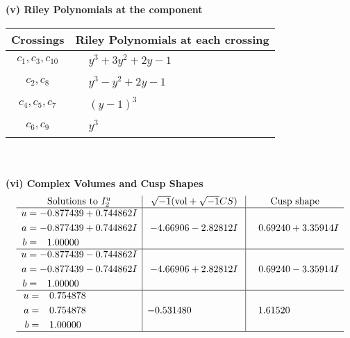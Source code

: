 \documentclass[1p]{elsarticle_modified}
\theoremstyle{definition}
\newcommand{\I}{\sqrt{-1}}
\begin{document}
\flushleft \textbf{(v) Riley Polynomials at the component}\newline \\
\begin{tabular}{m{50pt}|m{274pt}}
Crossings & \hspace{64pt}Riley Polynomials at each crossing \\
\hline $$\begin{aligned}c_{1},c_{3},c_{10}\end{aligned}$$&$\begin{aligned}
&y^3+3 y^2+2 y-1
\end{aligned}$\\
\hline $$\begin{aligned}c_{2},c_{8}\end{aligned}$$&$\begin{aligned}
&y^3- y^2+2 y-1
\end{aligned}$\\
\hline $$\begin{aligned}c_{4},c_{5},c_{7}\end{aligned}$$&$\begin{aligned}
&(y-1)^3
\end{aligned}$\\
\hline $$\begin{aligned}c_{6},c_{9}\end{aligned}$$&$\begin{aligned}
&y^3
\end{aligned}$\\
\hline
\end{tabular}\\~\\
\newpage\flushleft \textbf{(vi) Complex Volumes and Cusp Shapes}
$$\begin{array}{c|c|c}  
\text{Solutions to }I^u_{2}& \I (\text{vol} + \sqrt{-1}CS) & \text{Cusp shape}\\
 \hline 
\begin{aligned}
u &= -0.877439 + 0.744862 I \\
a &= -0.877439 + 0.744862 I \\
b &= \phantom{-}1.00000\phantom{ +0.000000I}\end{aligned}
 & -4.66906 - 2.82812 I & \phantom{-}0.69240 + 3.35914 I \\ \hline\begin{aligned}
u &= -0.877439 - 0.744862 I \\
a &= -0.877439 - 0.744862 I \\
b &= \phantom{-}1.00000\phantom{ +0.000000I}\end{aligned}
 & -4.66906 + 2.82812 I & \phantom{-}0.69240 - 3.35914 I \\ \hline\begin{aligned}
u &= \phantom{-}0.754878\phantom{ +0.000000I} \\
a &= \phantom{-}0.754878\phantom{ +0.000000I} \\
b &= \phantom{-}1.00000\phantom{ +0.000000I}\end{aligned}
 & -0.531480\phantom{ +0.000000I} & \phantom{-}1.61520\phantom{ +0.000000I}\\
 \hline 
 \end{array}$$\newpage
\end{document}

